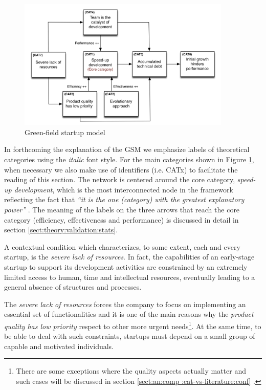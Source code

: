\documentclass[10pt,journal,letterpaper,compsoc]{IEEEtran}
\begin{document}
\begin{figure}[!t] 
\centering 
  \includegraphics[width=4in]{figures/high-level}
  \caption{Green-field startup model}\label{fig:gsm}
\end{figure}

In forthcoming the explanation of the GSM we emphasize labels of theoretical
categories using the \textit{italic} font style. For the main categories shown
in Figure \ref{fig:gsm}, when necessary we also make use of identifiers (i.e.
CATx) to facilitate the reading of this section. The network is centered around
the core category, \textit{speed-up  development}, which is the most
interconnected node in the framework reflecting  the fact that \textit{``it is
the one (category) with the greatest explanatory  power''}  \cite{Strauss1998}.
The meaning of the labels on the three arrows that  reach the core category
(efficiency, effectiveness and performance) is discussed  in detail in section
\ref{sect:theory:validation:stats}. %

A contextual condition which characterizes, to some extent, each and every
startup, is the \textit{severe lack of resources}. In fact, the capabilities of
an early-stage startup to support its development activities are constrained by
an extremely limited access to human, time and intellectual resources,
eventually leading to a general absence of structures and processes.

The \textit{severe lack of resources} forces the company to focus on
implementing an essential set of functionalities and it is one of the main
reasons why the \textit{product quality has low priority} respect to other more
urgent needs\footnote{There are some exceptions where the quality aspects
actually matter and such cases will be discussed in section \ref{sect:an:comp
:cat-vs-literature:conf}
.}. At the same time, to be able to deal with such constraints, startups must  
depend on a small group of capable and motivated individuals.
\end{document}
